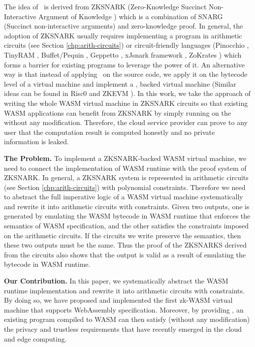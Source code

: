 The idea of \zkwasm\, is derived from ZKSNARK (Zero-Knowledge Succinct Non-Interactive Argument of Knowledge \cite{ben2013snarks, groth2016size, partala2020non-snark-survey}) which is a combination of SNARG (Succinct non-interactive arguments) and zero-knowledge proof. In general, the adoption of ZKSNARK usually requires implementing a program in arithmetic circuits (see Section \ref{chp:arith-circuits}) or circuit-friendly languages (Pinocchio \cite{parno2016pinocchio,jawurekzero-pin}, TinyRAM \cite{ben2013snarks-4c}, Buffet/Pequin \cite{wahby2014efficient-ram}, Geppetto \cite{costello2015geppetto}, xJsnark framework \cite{kosba2018xjsnark}, ZoKrates \cite{eberhardt2018zokrates}) which forms a barrier for existing programs to leverage the power of it. An alternative way is that instead of applying \zksnark\, on the source code, we apply it on the bytecode level of a virtual machine and implement a \zksnark, backed virtual machine (Similar ideas can be found in Risc0 \cite{risczero} and ZKEVM \cite{begassat2021specification-zkevm, different-zkevms}). In this work, we take the approach of writing the whole WASM virtual machine in ZKSNARK circuits so that existing WASM applications can benefit from ZKSNARK by simply running on the \zkwasm\, without any modification. Therefore, the cloud service provider can prove to any user that the computation result is computed honestly and no private information is leaked.

\smallskip\noindent\textbf{The Problem.}
To implement a ZKSNARK-backed WASM virtual machine, we need to connect the implementation of WASM runtime with the proof system of ZKSNARK. In general, a ZKSNARK system is represented in arithmetic circuits (see Section \ref{chp:arith-circuits}) with polynomial constraints. Therefore we need to abstract the full imperative logic of a WASM virtual machine systematically and rewrite it into arithmetic circuits with constraints. Given two outputs, one is generated by emulating the WASM bytecode in WASM runtime that enforces the semantics of WASM specification, and the other satisfies the constraints imposed on the arithmetic circuits. If the circuits we write preserve the semantics, then these two outputs must be the same. Thus the proof of the ZKSNARKS derived from the circuits also shows that the output is valid as a result of emulating the bytecode in WASM runtime. 

\smallskip\noindent\textbf{Our Contribution.}
In this paper, we systematically abstract the WASM runtime implementation and rewrite it into arithmetic circuits with constraints. By doing so, we have proposed and implemented the first zk-WASM virtual machine that supports WebAssembly specification. Moreover, by providing \zkwasm, an existing program compiled to WASM can then satisfy (without any modification)  the privacy and trustless requirements that have recently emerged in the cloud and edge computing.

